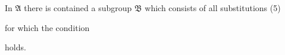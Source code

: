 In $\mathfrak{A}$ there is contained a subgroup $\mathfrak{B}$ which consists of all substitutions (5) %


for which the condition


holds.
